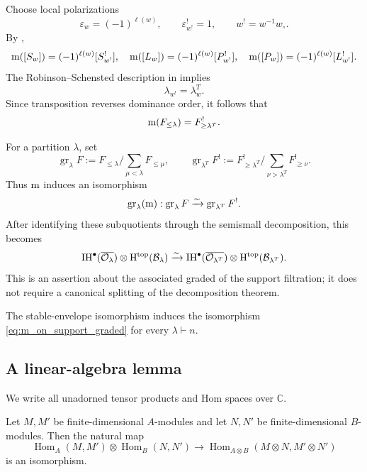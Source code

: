 Choose local polarizations
\[
  \varepsilon_w=(-1)^{\ell(w)},
  \qquad \varepsilon^!_{w^!}=1,
  \qquad w^!=w^{-1}w_\circ.
\]
By \cite[Remark 10.28]{braden2016quantizationsconicalsymplecticresolutions},
\[
  \mathrm{m}([S_w])=(-1)^{\ell(w)}[S^!_{w^!}],
  \quad
  \mathrm{m}([L_w])=(-1)^{\ell(w)}[P^!_{w^!}],
  \quad
  \mathrm{m}([P_w])=(-1)^{\ell(w)}[L^!_{w^!}].
\]
The Robinson--Schensted description in 
implies
\[
  \lambda_{w^!}=\lambda_w^T.
\]
Since transposition reverses dominance order, it follows that
\[
  \mathrm{m}(F_{\leq\lambda})=F^!_{\geq\lambda^T}.
\]

For a partition $\lambda$, set
\[
  \operatorname{gr}_\lambda F
  :=F_{\leq\lambda}\Big/
    \sum_{\mu<\lambda}F_{\leq\mu},
  \qquad
  \operatorname{gr}_{\lambda^T}F^!
  :=F^!_{\geq\lambda^T}\Big/
    \sum_{\nu>\lambda^T}F^!_{\geq\nu}.
\]
Thus $\mathrm{m}$ induces an isomorphism
\begin{equation}
  \label{eq:m_on_support_graded}
  \operatorname{gr}_\lambda(\mathrm{m}):
  \operatorname{gr}_\lambda F
  \xrightarrow{\sim}
  \operatorname{gr}_{\lambda^T}F^!.
\end{equation}
After identifying these subquotients through the semismall
decomposition, this becomes
\[
  \mathrm{IH}^\bullet(\overline{\mathcal O_\lambda})
    \otimes\mathrm{H}^\mathrm{top}(\mathcal{B}_\lambda)
  \xrightarrow{\sim}
  \mathrm{IH}^\bullet(\overline{\mathcal O_{\lambda^T}})
    \otimes\mathrm{H}^\mathrm{top}(\mathcal{B}_{\lambda^T}).
\]
This is an assertion about the associated graded of the support
filtration; it does not require a canonical splitting of the
decomposition theorem.

\begin{proposition}{}
  The stable-envelope isomorphism induces the isomorphism
  \eqref{eq:m_on_support_graded} for every $\lambda\vdash n$.
\end{proposition}

\subsection{A linear-algebra lemma}

We write all unadorned tensor products and Hom spaces over $\mathbb C$.

\begin{lemma}{}
  Let $M,M'$ be finite-dimensional $A$-modules and let $N,N'$ be
  finite-dimensional $B$-modules. Then the natural map
  \[
    \operatorname{Hom}_A(M,M')\otimes\operatorname{Hom}_B(N,N')
    \longrightarrow
    \operatorname{Hom}_{A\otimes B}(M\otimes N,M'\otimes N')
  \]
  is an isomorphism.
\end{lemma}


